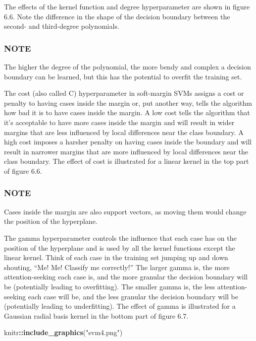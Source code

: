 \documentclass[
]{article}
\newenvironment{Shaded}{\begin{snugshade}}{\end{snugshade}}
\newcommand{\FunctionTok}[1]{\textcolor[rgb]{0.13,0.29,0.53}{\textbf{#1}}}
\newcommand{\NormalTok}[1]{#1}
\newcommand{\SpecialCharTok}[1]{\textcolor[rgb]{0.81,0.36,0.00}{\textbf{#1}}}
\newcommand{\StringTok}[1]{\textcolor[rgb]{0.31,0.60,0.02}{#1}}
\begin{document}
The effects of the kernel function and degree hyperparameter are shown
in figure 6.6. Note the difference in the shape of the decision boundary
between the second- and third-degree polynomials.

\subsubsection{NOTE}\label{note-13}

The higher the degree of the polynomial, the more bendy and complex a
decision boundary can be learned, but this has the potential to overfit
the training set.

The cost (also called C) hyperparameter in soft-margin SVMs assigns a
cost or penalty to having cases inside the margin or, put another way,
tells the algorithm how bad it is to have cases inside the margin. A low
cost tells the algorithm that it's acceptable to have more cases inside
the margin and will result in wider margins that are less influenced by
local differences near the class boundary. A high cost imposes a harsher
penalty on having cases inside the boundary and will result in narrower
margins that are more influenced by local differences near the class
boundary. The effect of cost is illustrated for a linear kernel in the
top part of figure 6.6.

\subsubsection{NOTE}\label{note-14}

Cases inside the margin are also support vectors, as moving them would
change the position of the hyperplane.

The gamma hyperparameter controls the influence that each case has on
the position of the hyperplane and is used by all the kernel functions
except the linear kernel. Think of each case in the training set jumping
up and down shouting, ``Me! Me! Classify me correctly!'' The larger
gamma is, the more attention-seeking each case is, and the more granular
the decision boundary will be (potentially leading to overfitting). The
smaller gamma is, the less attention-seeking each case will be, and the
less granular the decision boundary will be (potentially leading to
underfitting). The effect of gamma is illustrated for a Gaussian radial
basis kernel in the bottom part of figure 6.7.

\begin{Shaded}
\begin{Highlighting}[]
\NormalTok{knitr}\SpecialCharTok{::}\FunctionTok{include\_graphics}\NormalTok{(}\StringTok{"svm4.png"}\NormalTok{)}
\end{Highlighting}
\end{Shaded}
\end{document}
